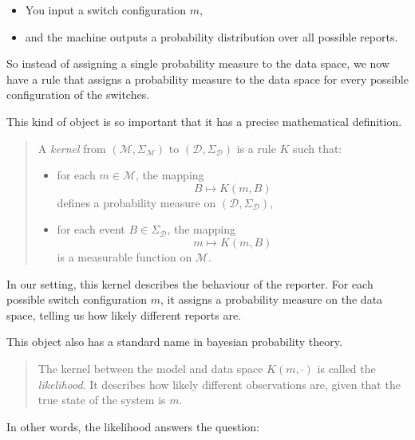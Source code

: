 \documentclass[11pt]{article}
\theoremstyle{remark}
\newcommand{\modelspace}{\mathcal{M}}
\newcommand{\dataspace}{\mathcal{D}}
\begin{document}
\begin{itemize}
    \item You input a switch configuration \(m\),
    \item and the machine outputs a probability distribution over all possible reports.
\end{itemize}

So instead of assigning a single probability measure to the data space, we now have a rule that assigns a probability measure to the data space for every possible configuration of the switches.

\vspace{2mm}

This kind of object is so important that it has a precise mathematical definition.

\begin{quote}
A \emph{kernel} from \((\modelspace, \Sigma_{\modelspace})\) to \((\dataspace, \Sigma_{\dataspace})\) is a rule \(K\) such that:
\begin{itemize}
    \item for each \(m \in \modelspace\), the mapping
    \[
    B \mapsto K(m,B)
    \]
    defines a probability measure on \((\dataspace, \Sigma_{\dataspace})\),
    \item for each event \(B \in \Sigma_{\dataspace}\), the mapping
    \[
    m \mapsto K(m,B)
    \]
    is a measurable function on \(\modelspace\).
\end{itemize}
\end{quote}

\vspace{2mm}

In our setting, this kernel describes the behaviour of the reporter. For each possible switch configuration \(m\), it assigns a probability measure on the data space, telling us how likely different reports are.

\vspace{2mm}

This object also has a standard name in bayesian probability theory.

\begin{quote}
The kernel between the model and data space \(K(m,\cdot)\) is called the \emph{likelihood}. It describes how likely different observations are, given that the true state of the system is \(m\).
\end{quote}

\vspace{2mm}

In other words, the likelihood answers the question:
\end{document}
